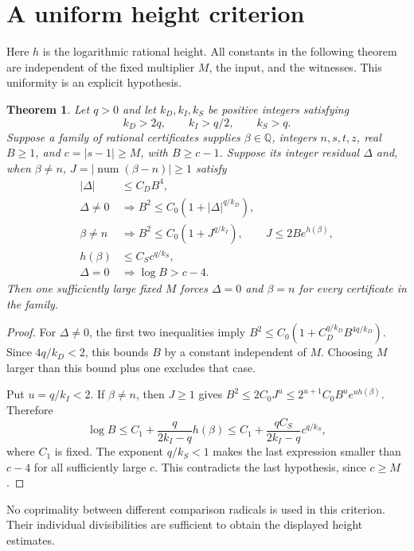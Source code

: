 \documentclass[11pt,a4paper]{article}
\newtheorem{theorem}{Theorem}[section]
\newcommand{\Q}{\mathbb Q}\newcommand{\Z}{\mathbb Z}
\begin{document}
\section{A uniform height criterion}
Here $h$ is the logarithmic rational height. All constants in the
following theorem are independent of the fixed multiplier $M$,
the input, and the witnesses. This uniformity is an explicit hypothesis.
\begin{theorem}\label{thm:height}
Let $q>0$ and let $k_D,k_I,k_S$ be positive integers satisfying
\[
                    k_D>2q,\qquad k_I>q/2,\qquad k_S>q.
\]
Suppose a family of rational certificates supplies $\beta\in\Q$,
integers $n,s,t,z$, real $B\ge1$, and $c=|s-1|\ge M$, with $B\ge c-1$.
Suppose its integer residual $\Delta$ and, when $\beta\ne n$,
$J=|\operatorname{num}(\beta-n)|\ge1$ satisfy
\begin{align*}
 |\Delta|&\le C_D B^4,\\
 \Delta\ne0&\Longrightarrow B^2\le C_0(1+|\Delta|^{q/k_D}),\\
 \beta\ne n&\Longrightarrow B^2\le C_0(1+J^{q/k_I}),
       \qquad J\le2B e^{h(\beta)},\\
 h(\beta)&\le C_S c^{q/k_S},\\
 \Delta=0&\Longrightarrow\log B>c-4.
\end{align*}
Then one sufficiently large fixed $M$ forces $\Delta=0$ and $\beta=n$
for every certificate in the family.
\end{theorem}
\begin{proof}
For $\Delta\ne0$, the first two inequalities imply
$B^2\le C_0(1+C_D^{q/k_D}B^{4q/k_D})$.
Since $4q/k_D<2$, this bounds $B$ by a constant independent of $M$.
Choosing $M$ larger than this bound plus one excludes that case.

Put $u=q/k_I<2$. If $\beta\ne n$, then $J\ge1$ gives
$B^2\le2C_0J^u\le2^{u+1}C_0B^u e^{u h(\beta)}$.
Therefore
\[
 \log B\le C_1+\frac{q}{2k_I-q}h(\beta)
 \le C_1+\frac{qC_S}{2k_I-q}c^{q/k_S},
\]
where $C_1$ is fixed. The exponent $q/k_S<1$ makes the last expression
smaller than $c-4$ for all sufficiently large $c$. This contradicts
the last hypothesis, since $c\ge M$.
\end{proof}
No coprimality between different comparison radicals is used in this
criterion. Their individual divisibilities are sufficient to obtain
the displayed height estimates.
\end{document}
